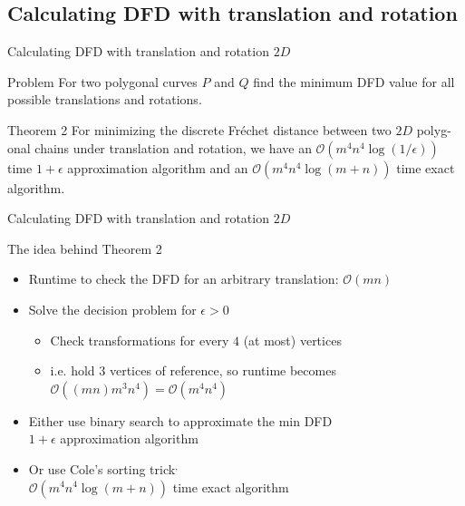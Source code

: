 \documentclass{beamer}
\begin{document}
\subsection{Calculating DFD with translation and rotation}

\begin{frame}{Calculating DFD with translation and rotation $2D$}
  \begin{block}{Problem}
    For  two polygonal curves $P$ and $Q$ find the minimum DFD value for all possible translations and rotations.
  \end{block}
  
  
  \begin{block}{Theorem 2\footnotemark}
    For minimizing the discrete Fréchet distance between two $2D$ polyg-onal chains under translation and rotation, we have an $\mathcal{O}(m^4n^4\log{}(1/\epsilon))$ time $1+\epsilon$ approximation algorithm and an $\mathcal{O}(m^4n^4\log{}(m+n))$ time exact algorithm.
  \end{block}
\end{frame}

\begin{frame}{Calculating DFD with translation and rotation $2D$}
  \begin{block}{The idea behind Theorem 2}
    \begin{itemize}
      \item Runtime to check the DFD for an arbitrary translation: $\mathcal{O}(mn)$
      \item Solve the decision problem for $\epsilon > 0$
        \begin{itemize}
          \item Check transformations for every $4$ (at most) vertices
          \item i.e. hold $3$ vertices of reference, so runtime becomes $\mathcal{O}((mn)m^3n^4) = \mathcal{O}(m^4n^4)$
        \end{itemize}
      \item Either use binary search to approximate the min DFD\\
        $1+\epsilon$ approximation algorithm
      \item Or use Cole’s sorting trick\footnotemark$^,$\footnotemark\\
        $\mathcal{O}(m^4n^4\log{}(m+n))$ time exact algorithm
    \end{itemize}
  \end{block}
\end{frame}
\end{document}

